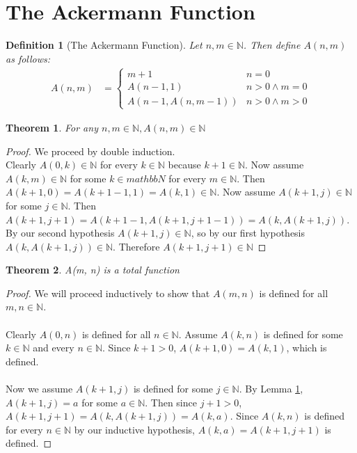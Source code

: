 \documentclass[12pt, letterpaper]{article}
\newtheorem{theorem}{Theorem}
\newtheorem*{definition}{Definition}
\theoremstyle{case}
\begin{document}
  \section{The Ackermann Function}
    \begin{definition}[The Ackermann Function]
      Let $n, m \in \mathbb{N}$. Then define $A(n, m)$ as follows:
      \begin{equation*}
        \begin{aligned}
          A(n, m) &=
          \begin{cases}
            m + 1                   & n = 0 \\
            A(n - 1, 1)             & n > 0 \wedge m = 0 \\
            A(n - 1, A(n, m - 1))   & n > 0 \wedge m > 0
          \end{cases}
        \end{aligned}
      \end{equation*}
    \end{definition}

    \begin{theorem}
      \label{inN}
      For any $n, m \in \mathbb{N}, A(n, m) \in \mathbb{N}$
    \end{theorem}
    \begin{proof}
      We proceed by double induction. \\
      Clearly $A(0, k) \in \mathbb{N}$ for every $k \in \mathbb{N}$ because $k + 1 \in \mathbb{N}$.
      Now assume $A(k, m) \in \mathbb{N}$ for some $k \in mathbb{N}$ for every $m \in \mathbb{N}$.
      Then $A(k + 1, 0) = A(k + 1 - 1, 1) = A(k, 1) \in \mathbb{N}$.
      Now assume $A(k + 1, j) \in \mathbb{N}$ for some $j \in \mathbb{N}$.
      Then $A(k + 1, j + 1) = A(k + 1 - 1, A(k + 1, j + 1 - 1)) = A(k, A(k + 1, j))$.
      By our second hypothesis $A(k + 1, j) \in \mathbb{N}$, so by our first hypothesis $A(k, A(k + 1, j)) \in \mathbb{N}$.
      Therefore $A(k + 1, j + 1) \in \mathbb{N}$
    \end{proof}

    \begin{theorem}
      A(m, n) is a total function
    \end{theorem}
    \begin{proof}
      We will proceed inductively to show that $A(m, n)$ is defined for all $m, n \in \mathbb{N}$.
      \\ 
      \\
      Clearly $A(0, n)$ is defined for all $n \in \mathbb{N}$.
      Assume $A(k, n)$ is defined for some $k \in \mathbb{N}$ and every $n \in \mathbb{N}$.
      Since $k + 1 > 0$, $A(k + 1, 0) = A(k, 1)$, which is defined.
      \\
      \\
      Now we assume $A(k + 1, j)$ is defined for some $j \in \mathbb{N}$.
      By Lemma \ref{inN}, $A(k + 1, j) = a$ for some $a \in \mathbb{N}$.
      Then since $j + 1 > 0$, $A(k + 1, j + 1) = A(k, A(k + 1, j)) = A(k, a)$.
      Since $A(k, n)$ is defined for every $n \in \mathbb{N}$ by our inductive hypothesis,
      $A(k, a) = A(k + 1, j + 1)$ is defined.
    \end{proof}
\end{document}
